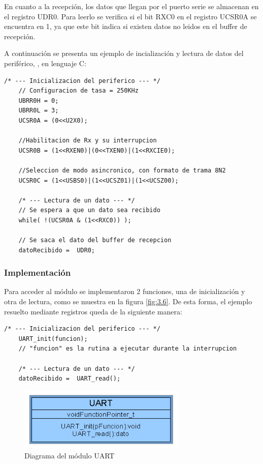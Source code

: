 En cuanto a la recepción, los datos que llegan por el puerto serie se almacenan en el registro UDR0. Para leerlo se verifica si el bit RXC0 en el registro UCSR0A se encuentra en 1, ya que este bit indica si existen datos no leidos en el buffer de recepción.

A continuación se presenta un ejemplo de incialización y lectura de datos del periférico, , en lenguaje C: 

\begin{lstlisting}[style=CStyle]
	/* --- Inicializacion del periferico --- */
	// Configuracion de tasa = 250KHz
	UBRR0H = 0;
	UBRR0L = 3;
	UCSR0A = (0<<U2X0);
	
	//Habilitacion de Rx y su interrupcion
	UCSR0B = (1<<RXEN0)|(0<<TXEN0)|(1<<RXCIE0); 
	
	//Seleccion de modo asincronico, con formato de trama 8N2
	UCSR0C = (1<<USBS0)|(1<<UCSZ01)|(1<<UCSZ00); 

	/* --- Lectura de un dato --- */
	// Se espera a que un dato sea recibido
	while( !(UCSR0A & (1<<RXC0)) ); 
	
	// Se saca el dato del buffer de recepcion
	datoRecibido =  UDR0;
\end{lstlisting}


\subsubsection{Implementación}
Para acceder al módulo se implementaron 2 funciones, una de inicialización y otra de lectura, como se muestra en la figura \ref{fig:3.6}. De esta forma, el ejemplo resuelto mediante registros queda de la siguiente manera:

\begin{lstlisting}[style=CStyle]
	/* --- Inicializacion del periferico --- */
	UART_init(funcion); 
	// "funcion" es la rutina a ejecutar durante la interrupcion
	
	/* --- Lectura de un dato --- */
	datoRecibido =  UART_read();
\end{lstlisting}

\begin{figure}[!ht]
	\centering
	\includegraphics[width=8cm,scale=1]{resources/3_6-moduloUART.png}
	\caption{Diagrama del módulo UART}
	\label{fig:\thefigure}
\end{figure}

